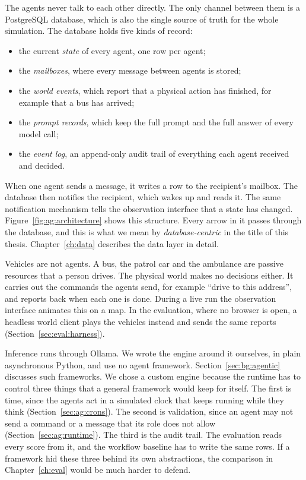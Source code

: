 The agents never talk to each other directly. The only channel between them is
a PostgreSQL database, which is also the single source of truth for the whole
simulation. The database holds five kinds of record:
\begin{itemize}
  \item the current \emph{state} of every agent, one row per agent;
  \item the \emph{mailboxes}, where every message between agents is stored;
  \item the \emph{world events}, which report that a physical action has
  finished, for example that a bus has arrived;
  \item the \emph{prompt records}, which keep the full prompt and the full
  answer of every model call;
  \item the \emph{event log}, an append-only audit trail of everything each
  agent received and decided.
\end{itemize}
When one agent sends a message, it writes a row to the recipient's mailbox. The
database then notifies the recipient, which wakes up and reads it. The same
notification mechanism tells the observation interface that a state has
changed. Figure~\ref{fig:ag:architecture} shows this structure. Every arrow in
it passes through the database, and this is what we mean by
\emph{database-centric} in the title of this thesis. Chapter~\ref{ch:data}
describes the data layer in detail.



Vehicles are not agents. A bus, the patrol car and the ambulance are passive
resources that a person drives. The physical world makes no decisions either.
It carries out the commands the agents send, for example ``drive to this address'', and reports back when
each one is done. During a live run the observation interface animates this on
a map. In the evaluation, where no browser is open, a headless world client
plays the vehicles instead and sends the same reports
(Section~\ref{sec:eval:harness}).

Inference runs through Ollama. We wrote the engine around it ourselves, in
plain asynchronous Python, and use no agent framework.
Section~\ref{sec:bg:agentic} discusses such frameworks. We chose a custom engine
because the runtime has to control three things that a general framework would
keep for itself. The first is time, since the agents act in a simulated clock
that keeps running while they think (Section~\ref{sec:ag:crons}). The second is
validation, since an agent may not send a command or a message that its role
does not allow (Section~\ref{sec:ag:runtime}). The third is the audit trail.
The evaluation reads every score from it, and the workflow baseline has to
write the same rows. If a framework hid these three behind its own
abstractions, the comparison in Chapter~\ref{ch:eval} would be much harder to
defend.

